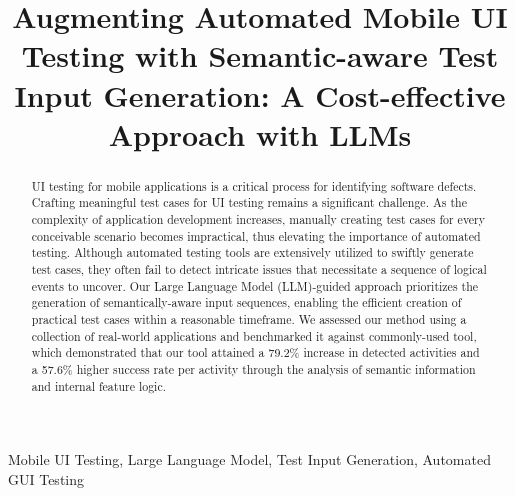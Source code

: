 \documentclass[conference]{IEEEtran}
\begin{document}
\title{Augmenting Automated Mobile UI Testing with Semantic-aware Test Input Generation: A Cost-effective Approach with LLMs}

\author{
    \and
    \and
}

\maketitle

\begin{abstract}
    UI testing for mobile applications is a critical process for identifying software defects. Crafting meaningful test cases for UI testing remains a significant challenge. As the complexity of application development increases, manually creating test cases for every conceivable scenario becomes impractical, thus elevating the importance of automated testing. Although automated testing tools are extensively utilized to swiftly generate test cases, they often fail to detect intricate issues that necessitate a sequence of logical events to uncover. Our Large Language Model (LLM)-guided approach prioritizes the generation of semantically-aware input sequences, enabling the efficient creation of practical test cases within a reasonable timeframe. We assessed our method using a collection of real-world applications and benchmarked it against commonly-used tool\cite{androidUIApplicationExerciser}, which demonstrated that our tool attained a 79.2\% increase in detected activities and a 57.6\% higher success rate per activity through the analysis of semantic information and internal feature logic.

\end{abstract}

\begin{IEEEkeywords}
    Mobile UI Testing, Large Language Model, Test Input Generation, Automated GUI Testing
\end{IEEEkeywords}
\end{document}
